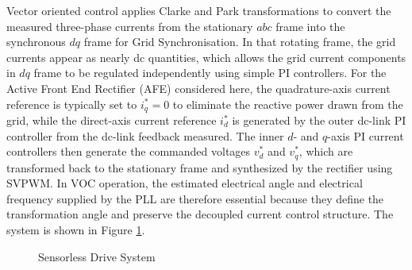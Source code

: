 Vector oriented control applies Clarke and Park transformations to convert the measured three-phase currents from the stationary \(abc\) frame into the synchronous \(dq\) frame for Grid Synchronisation. In that rotating frame, the grid currents appear as nearly dc quantities, which allows the grid current components in \(dq\) frame to be regulated independently using simple PI controllers. For the Active Front End Rectifier (AFE) considered here, the quadrature-axis current reference is typically set to \(i_q^{\ast}=0\) to eliminate the reactive power drawn from the grid, while the direct-axis current reference \(i_d^{\ast}\) is generated by the outer dc-link PI controller from the dc-link feedback measured. The inner \(d\)- and \(q\)-axis PI current controllers then generate the commanded voltages \(v_d^{\ast}\) and \(v_q^{\ast}\), which are transformed back to the stationary frame and synthesized by the rectifier using SVPWM. In VOC operation, the estimated electrical angle and electrical frequency supplied by the PLL are therefore essential because they define the transformation angle and preserve the decoupled current control structure. The system is shown in Figure \ref{fig:FocDiagram}.

\begin{figure}[h]
	\centering
	\resizebox{\textwidth}{!}{}
	\caption{Sensorless Drive System}
	\label{fig:FocDiagram}
\end{figure}




